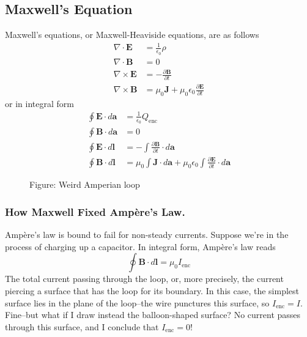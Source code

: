 \documentclass[../../../main.tex]{subfiles}
\begin{document}
\subsection{Maxwell's Equation}
Maxwell's equations, or Maxwell-Heaviside equations, are as follows
\begin{align*}
    \nabla\cdot\mathbf{E}&=\frac{1}{\epsilon_0}\rho\\
    \nabla\cdot\mathbf{B}&=0\\
    \nabla\times\mathbf{E}&=-\frac{\partial \mathbf{B}}{\partial t}\\
    \nabla\times\mathbf{B}&=\mu_0\mathbf{J}+\mu_0\epsilon_0\frac{\partial \mathbf{E}}{\partial t}
\end{align*}
or in integral form 
\begin{align*}
    \oint \mathbf{E}\cdot d\mathbf{a}&=\frac{1}{\epsilon_0}Q_\text{enc}\\
    \oint \mathbf{B}\cdot d\mathbf{a}&=0\\
    \oint \mathbf{E}\cdot d\mathbf{l}&=-\int \frac{\partial \mathbf{B}}{\partial t}\cdot d\mathbf{a}\\
    \oint \mathbf{B}\cdot d\mathbf{l}&=\mu_0\int\mathbf{J}\cdot d\mathbf{a}+ \mu_0\epsilon_0 \int\frac{\partial \mathbf{E}}{\partial t}\cdot d\mathbf{a}
\end{align*}

\begin{figure*}[b]
    \centering
    \caption*{Figure: Weird Amperian loop}
\end{figure*}

\subsubsection{How Maxwell Fixed Ampère’s Law.} Ampère’s law is bound to fail for non-steady currents. Suppose we’re in the process of charging up a capacitor. In integral form, Ampère’s law reads
\begin{equation*}
    \oint \mathbf{B}\cdot d\mathbf{l}=\mu_0 I_\text{enc}
\end{equation*}
The total current passing through the loop, or, more precisely, the current piercing a surface that has the loop for its boundary. In this case, the simplest surface lies in the plane of the loop--the wire punctures this surface, so $I_\text{enc} = I$. Fine--but what if I draw instead the balloon-shaped surface? No current passes through this surface, and I conclude that $I_\text{enc} = 0$!
\end{document}
